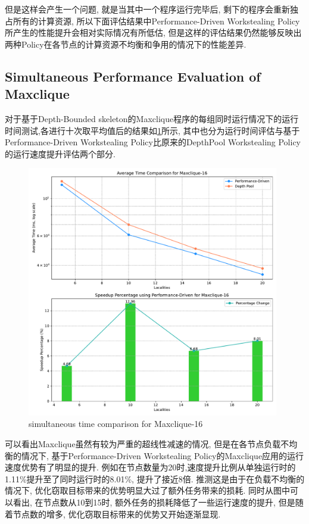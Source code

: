 \documentclass{mproj}
\begin{document}
但是这样会产生一个问题,
就是当其中一个程序运行完毕后,
剩下的程序会重新独占所有的计算资源,
所以下面评估结果中Performance-Driven Workstealing Policy所产生的性能提升会相对实际情况有所低估,
但是这样的评估结果仍然能够反映出两种Policy在各节点的计算资源不均衡和争用的情况下的性能差异.

\subsection{Simultaneous Performance Evaluation of Maxclique}

对于基于Depth-Bounded skeleton的Maxclique程序的每组同时运行情况下的运行时间测试,各进行十次取平均值后的结果如\cref{fig:time_comparison_max_simu}所示,
其中也分为运行时间评估与基于Performance-Driven Workstealing Policy比原来的DepthPool Workstealing Policy的运行速度提升评估两个部分.

\begin{figure}[h]
    \centering %
    \includegraphics[width=0.98\textwidth]{images/time_comparison_max_simultaneously.pdf} %
    \caption{simultaneous time comparison for Maxclique-16} %
    \label{fig:time_comparison_max_simu} %
\end{figure}
\FloatBarrier

可以看出Maxclique虽然有较为严重的超线性减速的情况,
但是在各节点负载不均衡的情况下,
基于Performance-Driven Workstealing Policy的Maxclique应用的运行速度优势有了明显的提升.
例如在节点数量为20时,速度提升比例从单独运行时的1.11\%提升至了同时运行时的8.01\%,
提升了接近8倍.
推测这是由于在负载不均衡的情况下,
优化窃取目标带来的优势明显大过了额外任务带来的损耗.
同时从图中可以看出,
在节点数从10到15时,
额外任务的损耗降低了一些运行速度的提升,
但是随着节点数的增多,
优化窃取目标带来的优势又开始逐渐显现.
\end{document}
